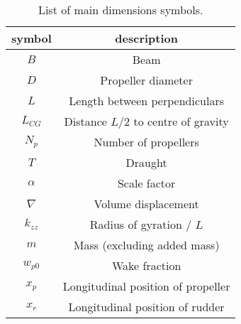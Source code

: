 \begin{table}[h]
\footnotesize
\caption{List of main dimensions symbols.}
    \label{tab:nomenclature}

    \centering
    \begin{tabular}{|c|c|}
\hline


symbol
&

description
\\
\hline

\(B\)
&

Beam
\\
\hline

\(D\)
&

Propeller diameter
\\
\hline

\(L\)
&

Length between perpendiculars
\\
\hline

\(L_{CG}\)
&

Distance \(L/2\) to centre of gravity
\\
\hline

\(N_p\)
&

Number of propellers
\\
\hline

\(T\)
&

Draught
\\
\hline

\(\alpha\)
&

Scale factor
\\
\hline

\(\nabla\)
&

Volume displacement
\\
\hline

\(k_{zz}\)
&

Radius of gyration / \(L\)
\\
\hline

\(m\)
&

Mass (excluding added mass)
\\
\hline

\(w_{p0}\)
&

Wake fraction
\\
\hline

\(x_{p}\)
&

Longitudinal position of propeller
\\
\hline

\(x_{r}\)
&

Longitudinal position of rudder
\\
\hline
\end{tabular}
\end{table}
